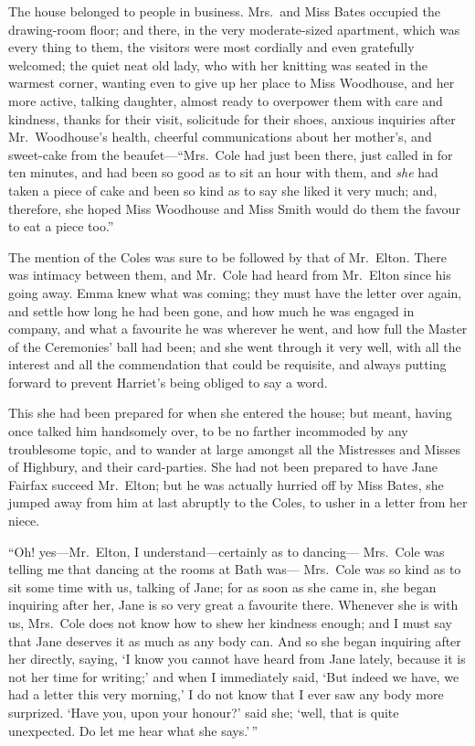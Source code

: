 The house belonged to people in business.  Mrs.\ and Miss Bates occupied
the drawing-room floor; and there, in the very moderate-sized apartment,
which was every thing to them, the visitors were most cordially
and even gratefully welcomed; the quiet neat old lady, who with her
knitting was seated in the warmest corner, wanting even to give up
her place to Miss Woodhouse, and her more active, talking daughter,
almost ready to overpower them with care and kindness, thanks for
their visit, solicitude for their shoes, anxious inquiries after
Mr.\ Woodhouse's health, cheerful communications about her mother's,
and sweet-cake from the beaufet---``Mrs.\ Cole had just been there,
just called in for ten minutes, and had been so good as to sit an
hour with them, and \emph{she} had taken a piece of cake and been so kind
as to say she liked it very much; and, therefore, she hoped Miss
Woodhouse and Miss Smith would do them the favour to eat a piece too.''

The mention of the Coles was sure to be followed by that of Mr.\ Elton.
There was intimacy between them, and Mr.\ Cole had heard from
Mr.\ Elton since his going away.  Emma knew what was coming; they must
have the letter over again, and settle how long he had been gone,
and how much he was engaged in company, and what a favourite he
was wherever he went, and how full the Master of the Ceremonies'
ball had been; and she went through it very well, with all the
interest and all the commendation that could be requisite, and always
putting forward to prevent Harriet's being obliged to say a word.

This she had been prepared for when she entered the house;
but meant, having once talked him handsomely over, to be no farther
incommoded by any troublesome topic, and to wander at large amongst
all the Mistresses and Misses of Highbury, and their card-parties.
She had not been prepared to have Jane Fairfax succeed Mr.\ Elton;
but he was actually hurried off by Miss Bates, she jumped away
from him at last abruptly to the Coles, to usher in a letter from
her niece.

``Oh! yes---Mr.\ Elton, I understand---certainly as to dancing---%
Mrs.\ Cole was telling me that dancing at the rooms at Bath was---%
Mrs.\ Cole was so kind as to sit some time with us, talking of Jane;
for as soon as she came in, she began inquiring after her,
Jane is so very great a favourite there.  Whenever she is with us,
Mrs.\ Cole does not know how to shew her kindness enough;
and I must say that Jane deserves it as much as any body can.
And so she began inquiring after her directly, saying, `I know you
cannot have heard from Jane lately, because it is not her time
for writing;' and when I immediately said, `But indeed we have,
we had a letter this very morning,' I do not know that I ever saw
any body more surprized.  `Have you, upon your honour?' said she;
`well, that is quite unexpected.  Do let me hear what she says.'\,''

